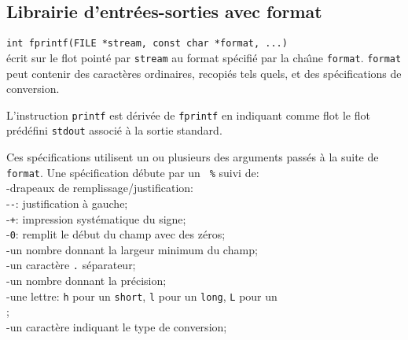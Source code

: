 \begin{frame}
  \section{Librairie d'entr\'ees-sorties avec format}

  {\tt int fprintf(FILE *stream, const char *format, ...)}\\
  \'ecrit sur le flot point\'e par {\tt stream} au format sp\'ecifi\'e
  par la cha\^\i{}ne {\tt format}. {\tt format} peut contenir des
  caract\`eres ordinaires, recopi\'es tels quels, et des
  sp\'ecifications de conversion.
  \par\bigskip
  L'instruction {\tt printf} est d\'eriv\'ee de {\tt fprintf} en
  indiquant comme flot le flot pr\'ed\'efini {\tt stdout} associ\'e
  \`a la sortie standard.
  
  \newpage
  
  Ces
  sp\'ecifications utilisent un ou plusieurs des arguments pass\'es \`a
  la suite de {\tt format}. Une sp\'ecification d\'ebute par un {\tt
    \%}
  suivi de:\\
  \hspace*{5mm}-drapeaux de remplissage/justification:\\
  \hspace*{7mm}-{\tt -}: justification \`a gauche;\\
  \hspace*{7mm}-{\tt +}: impression syst\'ematique du signe;\\
  \hspace*{7mm}-{\tt 0}: remplit le d\'ebut du champ avec des z\'eros;\\
  \hspace*{5mm}-un nombre donnant la largeur minimum du champ;\\
  \hspace*{5mm}-un caract\`ere {\tt .} s\'eparateur;\\
  \hspace*{5mm}-un nombre donnant la pr\'ecision;\\
  \hspace*{5mm}-une lettre: {\tt h} pour un {\tt short}, {\tt l} pour
  un
  {\tt long}, {\tt L} pour un \\
  \hspace*{7mm}{\tt long double};\\
  \hspace*{5mm}-un caract\`ere indiquant le type de conversion;


\end{frame}
